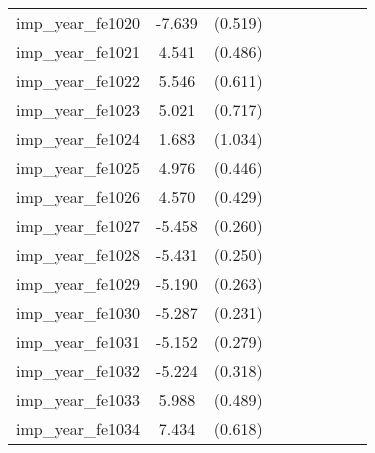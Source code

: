 {\begin{tabular}{l*{4}{cc}}
imp\_year\_fe1020&   -7.639\sym{***}&  (0.519)&                  &         &                  &         &                  &         \\
imp\_year\_fe1021&    4.541\sym{***}&  (0.486)&                  &         &                  &         &                  &         \\
imp\_year\_fe1022&    5.546\sym{***}&  (0.611)&                  &         &                  &         &                  &         \\
imp\_year\_fe1023&    5.021\sym{***}&  (0.717)&                  &         &                  &         &                  &         \\
imp\_year\_fe1024&    1.683         &  (1.034)&                  &         &                  &         &                  &         \\
imp\_year\_fe1025&    4.976\sym{***}&  (0.446)&                  &         &                  &         &                  &         \\
imp\_year\_fe1026&    4.570\sym{***}&  (0.429)&                  &         &                  &         &                  &         \\
imp\_year\_fe1027&   -5.458\sym{***}&  (0.260)&                  &         &                  &         &                  &         \\
imp\_year\_fe1028&   -5.431\sym{***}&  (0.250)&                  &         &                  &         &                  &         \\
imp\_year\_fe1029&   -5.190\sym{***}&  (0.263)&                  &         &                  &         &                  &         \\
imp\_year\_fe1030&   -5.287\sym{***}&  (0.231)&                  &         &                  &         &                  &         \\
imp\_year\_fe1031&   -5.152\sym{***}&  (0.279)&                  &         &                  &         &                  &         \\
imp\_year\_fe1032&   -5.224\sym{***}&  (0.318)&                  &         &                  &         &                  &         \\
imp\_year\_fe1033&    5.988\sym{***}&  (0.489)&                  &         &                  &         &                  &         \\
imp\_year\_fe1034&    7.434\sym{***}&  (0.618)&                  &         &                  &         &                  &         \\

\end{tabular}}

